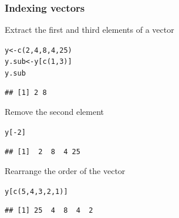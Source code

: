 \documentclass[color=usenames,dvipsnames]{beamer}\usepackage[]{graphicx}\usepackage[]{color}
\makeatletter
\newcommand{\hlnum}[1]{\textcolor[rgb]{0.69,0.494,0}{#1}}%
\newcommand{\hlopt}[1]{\textcolor[rgb]{0,0,0}{#1}}%
\newcommand{\hlstd}[1]{\textcolor[rgb]{0,0,0}{#1}}%
\newcommand{\hlkwb}[1]{\textcolor[rgb]{0,0.341,0.682}{#1}}%
\newcommand{\hlkwd}[1]{\textcolor[rgb]{0.004,0.004,0.506}{#1}}%
\newenvironment{kframe}{%
 \def\at@end@of@kframe{}%
 \ifinner\ifhmode%
  \def\at@end@of@kframe{\end{minipage}}%
  \begin{minipage}{\columnwidth}%
 \fi\fi%
 \def\FrameCommand##1{\hskip\@totalleftmargin \hskip-\fboxsep
 \colorbox{shadecolor}{##1}\hskip-\fboxsep
     \hskip-\linewidth \hskip-\@totalleftmargin \hskip\columnwidth}%
 \MakeFramed {\advance\hsize-\width
   \@totalleftmargin\z@ \linewidth\hsize
   \@setminipage}}%
 {\par\unskip\endMakeFramed%
 \at@end@of@kframe}
\newenvironment{knitrout}{}{} %
\makeatother
\begin{document}




\begin{frame}[fragile]
  \frametitle{Indexing vectors}
  Extract the first and third elements of a vector
\begin{knitrout}
\color{fgcolor}\begin{kframe}
\begin{alltt}
\hlstd{y} \hlkwb{<-} \hlkwd{c}\hlstd{(}\hlnum{2}\hlstd{,} \hlnum{4}\hlstd{,} \hlnum{8}\hlstd{,} \hlnum{4}\hlstd{,} \hlnum{25}\hlstd{)}
\hlstd{y.sub} \hlkwb{<-} \hlstd{y[}\hlkwd{c}\hlstd{(}\hlnum{1}\hlstd{,}\hlnum{3}\hlstd{)]}
\hlstd{y.sub}
\end{alltt}
\begin{verbatim}
## [1] 2 8
\end{verbatim}
\end{kframe}
\end{knitrout}
\pause \vfill
Remove the second element
\begin{knitrout}
\color{fgcolor}\begin{kframe}
\begin{alltt}
\hlstd{y[}\hlopt{-}\hlnum{2}\hlstd{]}
\end{alltt}
\begin{verbatim}
## [1]  2  8  4 25
\end{verbatim}
\end{kframe}
\end{knitrout}
\pause \vfill
Rearrange the order of the vector
\begin{knitrout}
\color{fgcolor}\begin{kframe}
\begin{alltt}
\hlstd{y[}\hlkwd{c}\hlstd{(}\hlnum{5}\hlstd{,}\hlnum{4}\hlstd{,}\hlnum{3}\hlstd{,}\hlnum{2}\hlstd{,}\hlnum{1}\hlstd{)]}
\end{alltt}
\begin{verbatim}
## [1] 25  4  8  4  2
\end{verbatim}
\end{kframe}
\end{knitrout}
\end{frame}
\end{document}
